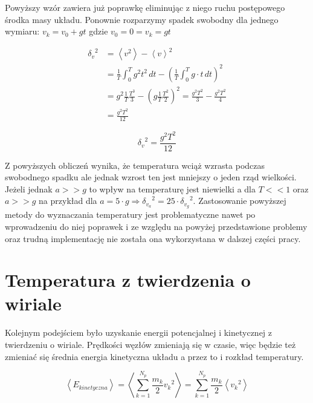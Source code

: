 \documentclass[12pt, letterpaper]{report}
\begin{document}
    Powyższy wzór zawiera już poprawkę eliminując z niego ruchu postępowego środka masy układu.
    Ponownie rozparzymy spadek swobodny dla jednego wymiaru: $v_k = v_0 + gt$ gdzie $v_0 = 0 = v_k = gt$

    \begin{align*}
        {\delta_v}^2  &=
        \left< v^2 \right> - \left< v \right>^2 \\ 
        &=  \frac{1}{T} \int_{0}^{T} g^2 t^2 \, dt  -  \left( \frac{1}{T} \int_{0}^{T} g \cdot t \, dt \right)^2  \\
        &=  g^2 \frac{1}{T} \frac{T^3}{3}  -  \left( g \frac{1}{T} \frac{T^2}{2} \right)^2  = \frac{g^2 T^2}{3}  -  \frac{g^2 T^2}{4} \\
        &=  \frac{g^2 T^2}{12}
    \end{align*}

    \begin{equation}
        {\delta_v}^2  =  \frac{g^2 T^2}{12}
    \end{equation}

    Z powyższych obliczeń wynika, że temperatura wciąż wzrasta podczas swobodnego spadku
    ale jednak wzrost ten jest mniejszy o jeden rząd wielkości. 
    Jeżeli jednak $a >> g$ to wpływ na temperaturę jest niewielki a dla $T << 1$ oraz $a >> g$ 
    na przykład dla $a = 5 \cdot g \Rightarrow {\delta_{v_a}}^2 = 25 \cdot {\delta_{v_g}}^2$.
    Zastosowanie powyższej metody do wyznaczania temperatury jest problematyczne nawet po wprowadzeniu do niej poprawek i
    ze względu na powyżej przedstawione problemy oraz trudną implementację nie została ona 
    wykorzystana w dalszej części pracy. 

    \section{Temperatura z twierdzenia o wiriale}
    Kolejnym podejściem było uzyskanie energii potencjalnej i kinetycznej z twierdzeniu o wiriale.
    Prędkości węzłów zmieniają się w czasie, więc będzie też zmieniać się średnia energia kinetyczna układu
    a przez to i rozkład temperatury.

    \begin{equation}
        \left< E_{kinetyczna} \right>  =  \left< \sum_{k = 1}^{N_p} \frac{m_k}{2} {v_k}^2 \right>
        = \sum_{k = 1}^{N_p} \frac{m_k}{2} \left< {v_k}^2 \right>
    \end{equation}
\end{document}
